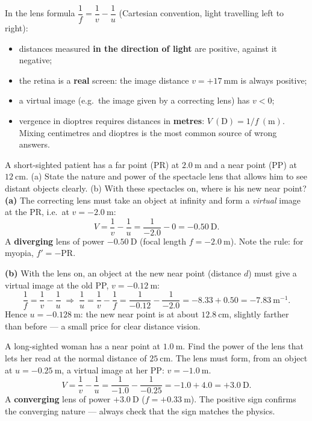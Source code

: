 \documentclass[11pt]{article}
\newcounter{popsec}
\newcounter{popsub}
\newcommand{\courssub}[1]{%
  \stepcounter{popsub}%
  \par\vspace{9pt}\noindent{\popxbold\fontsize{11.5}{13}\selectfont\color{popink}{\color{poporange}\thepopsec.\thepopsub}\hspace{6pt}#1}\par\nopagebreak\vspace{4pt}
}
\begin{document}
\courssub{Worked Examples and GCE Technique}

\begin{attention}
In the lens formula $\dfrac{1}{f} = \dfrac{1}{v} - \dfrac{1}{u}$ (Cartesian convention, light travelling left to right):
\begin{itemize}
\item distances measured \textbf{in the direction of light} are positive, against it negative;
\item the retina is a \textbf{real} screen: the image distance $v = +17\ \mathrm{mm}$ is always positive;
\item a virtual image (e.g.\ the image given by a correcting lens) has $v < 0$;
\item vergence in dioptres requires distances in \textbf{metres}: $V\ (\mathrm{D}) = 1/f\ (\mathrm{m})$. Mixing centimetres and dioptres is the most common source of wrong answers.
\end{itemize}
\end{attention}

\begin{exoresolu}
A short-sighted patient has a far point (PR) at $2.0\ \mathrm{m}$ and a near point (PP) at $12\ \mathrm{cm}$. (a) State the nature and power of the spectacle lens that allows him to see distant objects clearly. (b) With these spectacles on, where is his new near point?
\tcblower
\textbf{(a)} The correcting lens must take an object at infinity and form a \emph{virtual} image at the PR, i.e.\ at $v = -2.0\ \mathrm{m}$:
\[
V = \frac{1}{v} - \frac{1}{u} = \frac{1}{-2.0} - 0 = -0.50\ \mathrm{D}.
\]
A \textbf{diverging} lens of power $-0.50\ \mathrm{D}$ (focal length $f = -2.0\ \mathrm{m}$). Note the rule: for myopia, $f' = -\mathrm{PR}$.

\textbf{(b)} With the lens on, an object at the new near point (distance $d$) must give a virtual image at the old PP, $v = -0.12\ \mathrm{m}$:
\[
\frac{1}{f} = \frac{1}{v} - \frac{1}{u}
\;\Rightarrow\;
\frac{1}{u} = \frac{1}{v} - \frac{1}{f} = \frac{1}{-0.12} - \frac{1}{-2.0} = -8.33 + 0.50 = -7.83\ \mathrm{m^{-1}}.
\]
Hence $u = -0.128\ \mathrm{m}$: the new near point is at about $\boxed{12.8\ \mathrm{cm}}$, slightly farther than before --- a small price for clear distance vision.
\end{exoresolu}

\begin{exoresolu}
A long-sighted woman has a near point at $1.0\ \mathrm{m}$. Find the power of the lens that lets her read at the normal distance of $25\ \mathrm{cm}$.
\tcblower
The lens must form, from an object at $u = -0.25\ \mathrm{m}$, a virtual image at her PP: $v = -1.0\ \mathrm{m}$.
\[
V = \frac{1}{v} - \frac{1}{u} = \frac{1}{-1.0} - \frac{1}{-0.25} = -1.0 + 4.0 = +3.0\ \mathrm{D}.
\]
A \textbf{converging} lens of power $\boxed{+3.0\ \mathrm{D}}$ ($f = +0.33\ \mathrm{m}$). The positive sign confirms the converging nature --- always check that the sign matches the physics.
\end{exoresolu}
\end{document}
